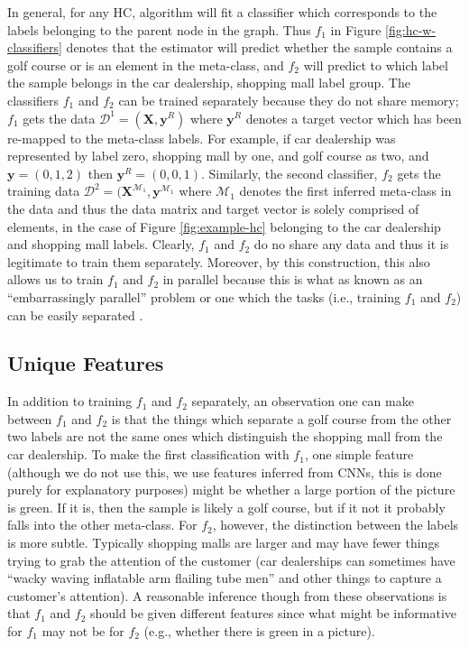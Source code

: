 \documentclass[../thesis.tex]{subfiles}
\begin{document}
In general, for any HC, algorithm will fit a classifier which corresponds to the labels belonging to the parent node in the graph. Thus $f_1$ in Figure \ref{fig:hc-w-classifiers} denotes that the estimator will predict whether the sample contains a golf course or is an element in the meta-class, and $f_2$ will predict to which label the sample belongs in the car dealership, shopping mall label group. The classifiers $f_1$ and $f_2$ can be trained separately because they do not share memory; $f_1$ gets the data $\mathcal{D}^1 = (\mathbf{X}, \mathbf{y}^R)$ where $\mathbf{y}^R$ denotes a target vector which has been re-mapped to the meta-class labels. For example, if car dealership was represented by label zero, shopping mall by one, and golf course as two, and $\mathbf{y} = (0, 1, 2)$ then $\mathbf{y}^R = (0, 0, 1)$. Similarly, the second classifier, $f_2$ gets the training data $\mathcal{D}^2 = (\mathbf{X}^{\mathcal{M}_1}, \mathbf{y}^{\mathcal{M}_1}$ where $\mathcal{M}_1$ denotes the first inferred meta-class in the data and thus the data matrix and target vector is solely comprised of elements, in the case of Figure \ref{fig:example-hc} belonging to the car dealership and shopping mall labels. Clearly, $f_1$ and $f_2$ do no share any data and thus it is legitimate to train them separately. Moreover, by this construction, this also allows us to train $f_1$ and $f_2$ in parallel because this is what as known as an ``embarrassingly parallel'' problem or one which the tasks (i.e., training $f_1$ and $f_2$) can be easily separated \cite{herlihy2012art}.

\subsection{Unique Features}
In addition to training $f_1$ and $f_2$ separately, an observation one can make between $f_1$ and $f_2$ is that the things which separate a golf course from the other two labels are not the same ones which distinguish the shopping mall from the car dealership. To make the first classification with $f_1$, one simple feature (although we do not use this, we use features inferred from CNNs, this is done purely for explanatory purposes) might be whether a large portion of the picture is green. If it is, then the sample is likely a golf course, but if it not it probably falls into the other meta-class. For $f_2$, however, the distinction between the labels is more subtle. Typically shopping malls are larger and may have fewer things trying to grab the attention of the customer (car dealerships can sometimes have ``wacky waving inflatable arm flailing tube men'' \cite{wacky_wavy} and other things to capture a customer's attention). A reasonable inference though from these observations is that $f_1$ and $f_2$ should be given different features since what might be informative for $f_1$ may not be for $f_2$ (e.g., whether there is green in a picture). 
\end{document}
